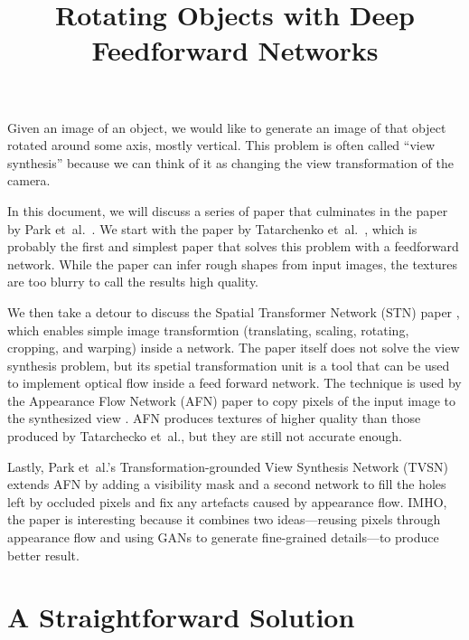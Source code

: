 \documentclass[10pt]{article}
\title{Rotating Objects with Deep Feedforward Networks}
\newcommand{\etal}{{et~al.}}
\begin{document}
  \maketitle

  Given an image of an object, we would like to generate an image of that object rotated around some axis, mostly vertical. This problem is often called ``view synthesis'' because we can think of it as changing the view transformation of the camera.

  In this document, we will discuss a series of paper that culminates in the paper by Park \etal~\cite{Park:2017}. We start with the paper by Tatarchenko \etal~\cite{Tatarchenko:2016}, which is probably the first and simplest paper that solves this problem with a feedforward network. While the paper can infer rough shapes from input images, the textures are too blurry to call the results high quality.

  We then take a detour to discuss the Spatial Transformer Network (STN) paper \cite{Jaderberg:2015}, which enables simple image transformtion (translating, scaling, rotating, cropping, and warping) inside a network. The paper itself does not solve the view synthesis problem, but its spetial transformation unit is a tool that can be used to implement optical flow inside a feed forward network. The technique is used by the Appearance Flow Network (AFN) paper to copy pixels of the input image to the synthesized view \cite{Zhou:2016}. AFN produces textures of higher quality than those produced by Tatarchecko \etal, but they are still not accurate enough.

  Lastly, Park \etal's Transformation-grounded View Synthesis Network (TVSN) extends AFN by adding a visibility mask and a second network to fill the holes left by occluded pixels and fix any artefacts caused by appearance flow. IMHO, the paper is interesting because it combines two ideas---reusing pixels through appearance flow and using GANs to generate fine-grained details---to produce better result.

  \section{A Straightforward Solution}
\end{document}
